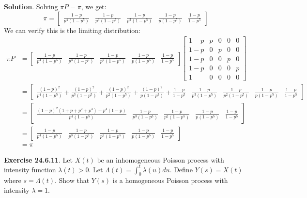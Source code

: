 \textbf{Solution}.
Solving \(\pi P = \pi\), we get:
\[
\pi = \begin{bmatrix} 
\frac{1 - p}{p^{4}(1 - p^{5})} &
\frac{1 - p}{p^{3}(1 - p^{5})} &
\frac{1 - p}{p^{2}(1 - p^{5})} &
\frac{1 - p}{p(1 - p^{5})} &
\frac{1 - p}{1 - p^{5}}
\end{bmatrix}
\]
We can verify this is the limiting distribution:
\begin{align*}
\pi P &= \begin{bmatrix} \frac{1 - p}{p^{4}(1 - p^{5})} &
\frac{1 - p}{p^{3}(1 - p^{5})} &
\frac{1 - p}{p^{2}(1 - p^{5})} &
\frac{1 - p}{p(1 - p^{5})} &
\frac{1 - p}{1 - p^{5}}
\end{bmatrix}
\begin{bmatrix}
1 - p & p & 0 & 0 & 0 \\
1 - p & 0 & p & 0 & 0 \\
1 - p & 0 & 0 & p & 0 \\
1 - p & 0 & 0 & 0 & p \\
1 & 0 & 0 & 0 & 0
\end{bmatrix} \\
&= \begin{bmatrix} 
\frac{(1 - p)^{2}}{p^{4}(1 - p^{5})}
+ \frac{(1 - p)^{2}}{p^{3}(1 - p^{5})}
+ \frac{(1 - p)^{2}}{p^{2}(1 - p^{5})}
+ \frac{(1 - p)^{2}}{p(1 - p^{5})}
+ \frac{1 - p}{1 - p^{5}} &
\frac{1 - p}{p^{3}(1 - p^{5})} &
\frac{1 - p}{p^{2}(1 - p^{5})} &
\frac{1 - p}{p(1 - p^{5})} &
\frac{1 - p}{1 - p^{5}}
\end{bmatrix} \\
&= \begin{bmatrix} 
\frac{(1 - p)^{2}(1 + p + p^{2} + p^{3}) + p^{4}(1 - p)}{p^{4}(1 - p^{5})} &
\frac{1 - p}{p^{3}(1 - p^{5})} &
\frac{1 - p}{p^{2}(1 - p^{5})} &
\frac{1 - p}{p(1 - p^{5})} &
\frac{1 - p}{1 - p^{5}}
\end{bmatrix} \\
&= \begin{bmatrix} 
\frac{1 - p}{p^{4}(1 - p^{5})} &
\frac{1 - p}{p^{3}(1 - p^{5})} &
\frac{1 - p}{p^{2}(1 - p^{5})} &
\frac{1 - p}{p(1 - p^{5})} &
\frac{1 - p}{1 - p^{5}}
\end{bmatrix} \\
&= \pi
\end{align*}

\textbf{Exercise 24.6.11}. Let \(X(t)\) be an inhomogeneous Poisson
process with intensity function \(\lambda(t) > 0\). Let
\(\Lambda(t) = \int_{0}^t \lambda(u) du\). Define \(Y(s) = X(t)\) where
\(s = \Lambda(t)\). Show that \(Y(s)\) is a homogeneous Poisson process
with intensity \(\lambda = 1\).

